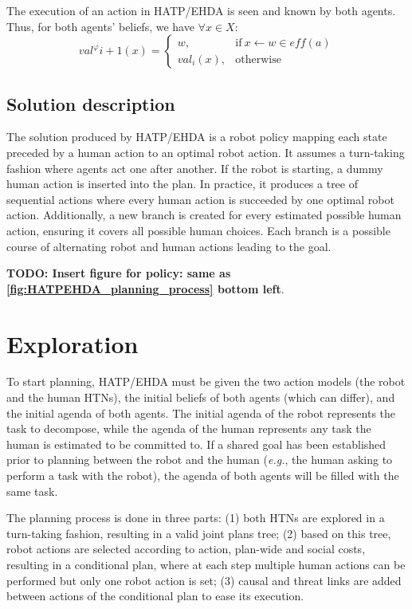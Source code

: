 The execution of an action in HATP/EHDA is seen and known by both agents. Thus, for both agents' beliefs, we have $\forall x \in X$: 
\begin{equation}
    val^\varphi{i+1}(x) = \left\{ 
    \begin{array}{ll}
        w, & \mbox{if} ~ x \leftarrow w \in \textit{eff}(a)   \\ 
        val_i(x), & \mbox{otherwise}
    \end{array}\right.
\end{equation}


\subsection*{Solution description}

The solution produced by HATP/EHDA is a robot policy mapping each state preceded by a human action to an optimal robot action. It assumes a turn-taking fashion where agents act one after another. If the robot is starting, a dummy human action is inserted into the plan. In practice, it produces a tree of sequential actions where every human action is succeeded by one optimal robot action. Additionally, a new branch is created for every estimated possible human action, ensuring it covers all possible human choices. Each branch is a possible course of alternating robot and human actions leading to the goal.

\textbf{TODO: Insert figure for policy: same as \ref{fig:HATPEHDA_planning_process} bottom left}.


\section{Exploration}

To start planning, HATP/EHDA must be given the two action models (the robot and the human HTNs), the initial beliefs of both agents (which can differ), and the initial agenda of both agents. The initial agenda of the robot represents the task to decompose, while the agenda of the human represents any task the human is estimated to be committed to. If a shared goal has been established prior to planning between the robot and the human (\textit{e.g.}, the human asking to perform a task with the robot), the agenda of both agents will be filled with the same task.

The planning process is done in three parts: (1) both HTNs are explored in a turn-taking fashion, resulting in a valid joint plans tree; (2) based on this tree, robot actions are selected according to action, plan-wide and social costs, resulting in a conditional plan, where at each step multiple human actions can be performed but only one robot action is set; (3) causal and threat links are added between actions of the conditional plan to ease its execution.

